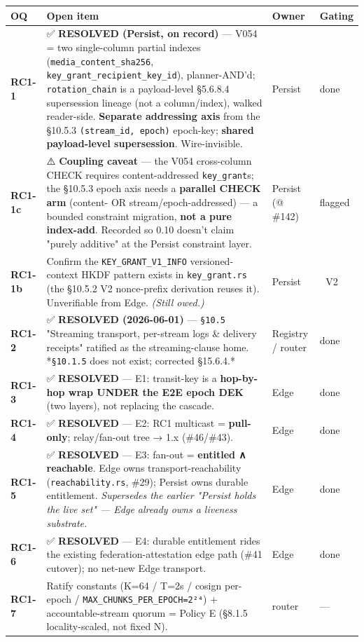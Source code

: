 \documentclass[10pt]{article}
\begin{document}
{\scriptsize
\begin{longtable}{|p{4.0cm}|p{4.0cm}|p{4.0cm}|p{4.0cm}|}\hline
\textbf{OQ} & \textbf{Open item} & \textbf{Owner} & \textbf{Gating} \\ \hline\endhead
\textbf{RC1-1} & ✅ \textbf{RESOLVED (Persist, on record)} — V054 = two single-column partial indexes (\texttt{media\_content\_sha256}, \texttt{key\_grant\_recipient\_key\_id}), planner-AND'd; \texttt{rotation\_chain} is a payload-level §5.6.8.4 supersession lineage (not a column/index), walked reader-side. \textbf{Separate addressing axis} from the §10.5.3 \texttt{(stream\_id, epoch)} epoch-key; \textbf{shared payload-level supersession}. Wire-invisible. & Persist & done \\ \hline
\textbf{RC1-1c} & ⚠️ \textbf{Coupling caveat} — the V054 cross-column CHECK requires content-addressed \texttt{key\_grant}s; the §10.5.3 epoch axis needs a \textbf{parallel CHECK arm} (content- OR stream/epoch-addressed) — a bounded constraint migration, \textbf{not a pure index-add}. Recorded so 0.10 doesn't claim "purely additive" at the Persist constraint layer. & Persist (@ \#142) & flagged \\ \hline
\textbf{RC1-1b} & Confirm the \texttt{KEY\_GRANT\_V1\_INFO} versioned-context HKDF pattern exists in \texttt{key\_grant.rs} (the §10.5.2 V2 nonce-prefix derivation reuses it). Unverifiable from Edge. \textit{(Still owed.)} & Persist & 🔴 V2 \\ \hline
\textbf{RC1-2} & ✅ \textbf{RESOLVED (2026-06-01)} — \texttt{§10.5} "Streaming transport, per-stream logs \& delivery receipts" ratified as the streaming-clause home. *\texttt{§10.1.5} does not exist; corrected §15.6.4.* & Registry / router & done \\ \hline
\textbf{RC1-3} & ✅ \textbf{RESOLVED} — E1: transit-key is a \textbf{hop-by-hop wrap UNDER the E2E epoch DEK} (two layers), not replacing the cascade. & Edge & done \\ \hline
\textbf{RC1-4} & ✅ \textbf{RESOLVED} — E2: RC1 multicast = \textbf{pull-only}; relay/fan-out tree → 1.x (\#46/\#43). & Edge & done \\ \hline
\textbf{RC1-5} & ✅ \textbf{RESOLVED} — E3: fan-out = \textbf{entitled ∧ reachable}. Edge owns transport-reachability (\texttt{reachability.rs}, \#29); Persist owns durable entitlement. \textit{Supersedes the earlier "Persist holds the live set" — Edge already owns a liveness substrate.} & Edge & done \\ \hline
\textbf{RC1-6} & ✅ \textbf{RESOLVED} — E4: durable entitlement rides the existing federation-attestation edge path (\#41 cutover); no net-new Edge transport. & Edge & done \\ \hline
\textbf{RC1-7} & Ratify constants (K=64 / T=2s / cosign per-epoch / \texttt{MAX\_CHUNKS\_PER\_EPOCH=2²⁴}) + accountable-stream quorum = Policy E (§8.1.5 locality-scaled, not fixed N). & router & — \\ \hline
\end{longtable}}
\end{document}
